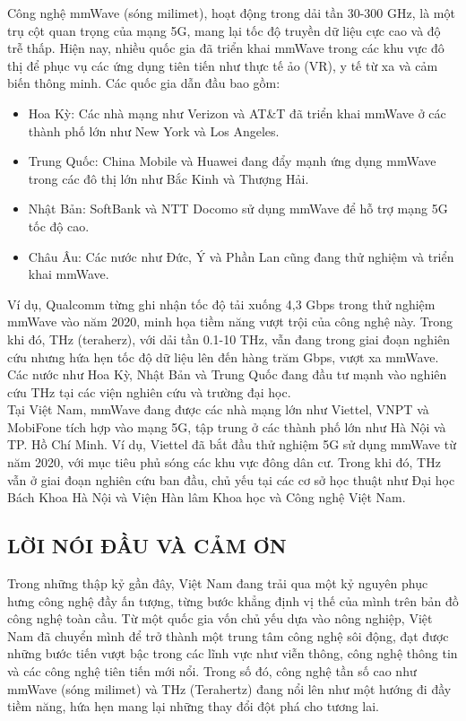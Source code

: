 \documentclass[a4paper,13pt]{article} %
\begin{document}
Công nghệ mmWave (sóng milimet), hoạt động trong dải tần 30-300 GHz, là một trụ cột quan trọng của mạng 5G, mang lại tốc độ truyền dữ liệu cực cao và độ trễ thấp. Hiện nay, nhiều quốc gia đã triển khai mmWave trong các khu vực đô thị để phục vụ các ứng dụng tiên tiến như thực tế ảo (VR), y tế từ xa và cảm biến thông minh. Các quốc gia dẫn đầu bao gồm: \\
\begin{itemize}
    \item Hoa Kỳ: Các nhà mạng như Verizon và AT&T đã triển khai mmWave ở các thành phố lớn như New York và Los Angeles.
    \item Trung Quốc: China Mobile và Huawei đang đẩy mạnh ứng dụng mmWave trong các đô thị lớn như Bắc Kinh và Thượng Hải.
    \item Nhật Bản: SoftBank và NTT Docomo sử dụng mmWave để hỗ trợ mạng 5G tốc độ cao.
    \item Châu Âu: Các nước như Đức, Ý và Phần Lan cũng đang thử nghiệm và triển khai mmWave.
\end{itemize}
Ví dụ, Qualcomm từng ghi nhận tốc độ tải xuống 4,3 Gbps trong thử nghiệm mmWave vào năm 2020, minh họa tiềm năng vượt trội của công nghệ này. Trong khi đó, THz (teraherz), với dải tần 0.1-10 THz, vẫn đang trong giai đoạn nghiên cứu nhưng hứa hẹn tốc độ dữ liệu lên đến hàng trăm Gbps, vượt xa mmWave. Các nước như Hoa Kỳ, Nhật Bản và Trung Quốc đang đầu tư mạnh vào nghiên cứu THz tại các viện nghiên cứu và trường đại học.\\

Tại Việt Nam, mmWave đang được các nhà mạng lớn như Viettel, VNPT và MobiFone tích hợp vào mạng 5G, tập trung ở các thành phố lớn như Hà Nội và TP. Hồ Chí Minh. Ví dụ, Viettel đã bắt đầu thử nghiệm 5G sử dụng mmWave từ năm 2020, với mục tiêu phủ sóng các khu vực đông dân cư. Trong khi đó, THz vẫn ở giai đoạn nghiên cứu ban đầu, chủ yếu tại các cơ sở học thuật như Đại học Bách Khoa Hà Nội và Viện Hàn lâm Khoa học và Công nghệ Việt Nam.
\vspace{2cm}
\clearpage  
\begin{center}
\section{LỜI NÓI ĐẦU VÀ CẢM ƠN }
\end{center}

Trong những thập kỷ gần đây, Việt Nam đang trải qua một kỷ nguyên phục hưng công nghệ đầy ấn tượng, từng bước khẳng định vị thế của mình trên bản đồ công nghệ toàn cầu. Từ một quốc gia vốn chủ yếu dựa vào nông nghiệp, Việt Nam đã chuyển mình để trở thành một trung tâm công nghệ sôi động, đạt được những bước tiến vượt bậc trong các lĩnh vực như viễn thông, công nghệ thông tin và các công nghệ tiên tiến mới nổi. Trong số đó, công nghệ tần số cao như mmWave (sóng milimet) và THz (Terahertz) đang nổi lên như một hướng đi đầy tiềm năng, hứa hẹn mang lại những thay đổi đột phá cho tương lai.\\
\end{document}
